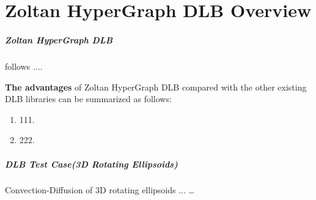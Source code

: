 \chapter{Zoltan HyperGraph DLB Overview }

\paragraph{Zoltan HyperGraph DLB} follows ....

\textbf{The advantages} of Zoltan HyperGraph DLB compared with the other existing DLB libraries can be summarized as follows:

\begin{enumerate}

\item  111.
\item  222.

\end{enumerate}


\noindent\paragraph{DLB Test Case(3D Rotating Ellipsoids)}
Convection-Diffusion of 3D rotating ellipsoids ... \ldots
